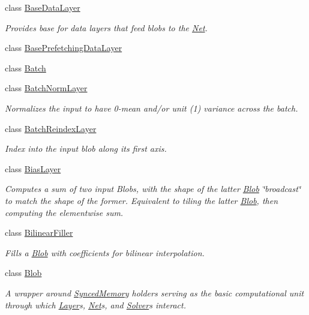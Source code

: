 \begin{DoxyCompactItemize}
class \hyperlink{classcaffe_1_1BaseDataLayer}{Base\+Data\+Layer}
\begin{DoxyCompactList}\small\item\em Provides base for data layers that feed blobs to the \hyperlink{classcaffe_1_1Net}{Net}. \end{DoxyCompactList}\item 
class \hyperlink{classcaffe_1_1BasePrefetchingDataLayer}{Base\+Prefetching\+Data\+Layer}
\item 
class \hyperlink{classcaffe_1_1Batch}{Batch}
\item 
class \hyperlink{classcaffe_1_1BatchNormLayer}{Batch\+Norm\+Layer}
\begin{DoxyCompactList}\small\item\em Normalizes the input to have 0-\/mean and/or unit (1) variance across the batch. \end{DoxyCompactList}\item 
class \hyperlink{classcaffe_1_1BatchReindexLayer}{Batch\+Reindex\+Layer}
\begin{DoxyCompactList}\small\item\em Index into the input blob along its first axis. \end{DoxyCompactList}\item 
class \hyperlink{classcaffe_1_1BiasLayer}{Bias\+Layer}
\begin{DoxyCompactList}\small\item\em Computes a sum of two input Blobs, with the shape of the latter \hyperlink{classcaffe_1_1Blob}{Blob} \char`\"{}broadcast\char`\"{} to match the shape of the former. Equivalent to tiling the latter \hyperlink{classcaffe_1_1Blob}{Blob}, then computing the elementwise sum. \end{DoxyCompactList}\item 
class \hyperlink{classcaffe_1_1BilinearFiller}{Bilinear\+Filler}
\begin{DoxyCompactList}\small\item\em Fills a \hyperlink{classcaffe_1_1Blob}{Blob} with coefficients for bilinear interpolation. \end{DoxyCompactList}\item 
class \hyperlink{classcaffe_1_1Blob}{Blob}
\begin{DoxyCompactList}\small\item\em A wrapper around \hyperlink{classcaffe_1_1SyncedMemory}{Synced\+Memory} holders serving as the basic computational unit through which \hyperlink{classcaffe_1_1Layer}{Layer}s, \hyperlink{classcaffe_1_1Net}{Net}s, and \hyperlink{classcaffe_1_1Solver}{Solver}s interact. \end{DoxyCompactList}\item 

\end{DoxyCompactItemize}
